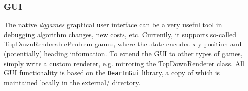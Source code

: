 \subsubsection*{G\+UI}

The native {\itshape ilqgames} graphical user interface can be a very useful tool in debugging algorithm changes, new costs, etc. Currently, it supports so-\/called {\ttfamily Top\+Down\+Renderable\+Problem} games, where the state encodes x-\/y position and (potentially) heading information. To extend the G\+UI to other types of games, simply write a custom renderer, e.\+g. mirroring the {\ttfamily Top\+Down\+Renderer} class. All G\+UI functionality is based on the \href{https://github.com/ocornut/imgui}{\tt Dear\+Im\+Gui} library, a copy of which is maintained locally in the {\ttfamily external/} directory. 